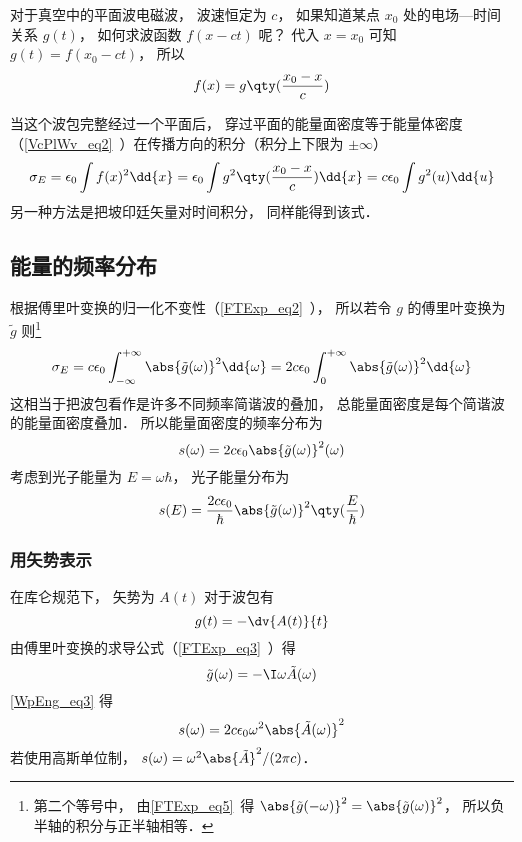 

对于真空中的平面波电磁波， 波速恒定为 $c$， 如果知道某点 $x_0$ 处的电场—时间关系 $g(t)$， 如何求波函数 $f(x - ct)$ 呢？ 代入 $x = x_0$ 可知 $g(t) = f(x_0 - ct)$， 所以
\begin{equation}
f(x) = g\qty(\frac{x_0 - x}{c})
\end{equation}

当这个波包完整经过一个平面后， 穿过平面的能量面密度等于能量体密度（\autoref{VcPlWv_eq2}~）在传播方向的积分（积分上下限为 $\pm\infty$）
\begin{equation}\label{WpEng_eq1}
\sigma_E = \epsilon_0 \int f(x)^2 \dd{x} = \epsilon_0  \int g^2\qty(\frac{x_0 - x}{c}) \dd{x} = c\epsilon_0 \int g^2(u) \dd{u}
\end{equation}
另一种方法是把坡印廷矢量对时间积分， 同样能得到该式．

\subsection{能量的频率分布}
根据傅里叶变换的归一化不变性（\autoref{FTExp_eq2}~）， 所以若令 $g$ 的傅里叶变换为 $\tilde g$ 则\footnote{第二个等号中， 由\autoref{FTExp_eq5}~得 $\abs{\tilde g(-\omega)}^2 = \abs{\tilde g(\omega)}^2$， 所以负半轴的积分与正半轴相等．}
\begin{equation}
\sigma_E = c\epsilon_0 \int_{-\infty}^{+\infty} \abs{\tilde g(\omega)}^2 \dd{\omega} = 2c\epsilon_0 \int_{0}^{+\infty} \abs{\tilde g(\omega)}^2 \dd{\omega}
\end{equation}
这相当于把波包看作是许多不同频率简谐波的叠加， 总能量面密度是每个简谐波的能量面密度叠加． 所以能量面密度的频率分布为
\begin{equation}\label{WpEng_eq3}
s(\omega) = 2c\epsilon_0 \abs{\tilde g(\omega)}^2(\omega)
\end{equation}
考虑到光子能量为 $E = \omega\hbar$， 光子能量分布为
\begin{equation}\label{WpEng_eq2}
s(E) = \frac{2c\epsilon_0}{\hbar} \abs{\tilde g(\omega)}^2 \qty(\frac{E}{\hbar})
\end{equation}

\subsubsection{用矢势表示}
在库仑规范下， 矢势为 $A(t)$ 对于波包有
\begin{equation}
g(t) = -\dv{A(t)}{t}
\end{equation}
由傅里叶变换的求导公式（\autoref{FTExp_eq3}~）得
\begin{equation}\label{WpEng_eq4}
\tilde g(\omega) = -\I \omega \tilde A(\omega)
\end{equation}
\autoref{WpEng_eq3} 得
\begin{equation}\label{WpEng_eq5}
s(\omega) = 2c\epsilon_0 \omega^2 \abs{\tilde A(\omega)}^2
\end{equation}
若使用高斯单位制， $s(\omega) = \omega^2 \abs{\tilde A}^2/(2\pi c)$．
